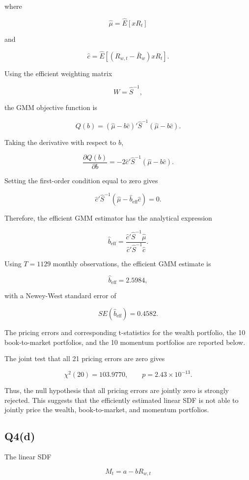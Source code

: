 \documentclass{article}
\begin{document}
where

\[
\hat\mu
=
\hat E[xR_t]
\]

and

\[
\hat c
=
\hat E\left[
(R_{w,t}-\bar R_w)xR_t
\right].
\]

Using the efficient weighting matrix

\[
W=\hat S^{-1},
\]

the GMM objective function is

\[
Q(b)
=
(\hat\mu-b\hat c)'
\hat S^{-1}
(\hat\mu-b\hat c).
\]

Taking the derivative with respect to \(b\),

\[
\frac{\partial Q(b)}{\partial b}
=
-2\hat c'
\hat S^{-1}
(\hat\mu-b\hat c).
\]

Setting the first-order condition equal to zero gives

\[
\hat c'
\hat S^{-1}
(\hat\mu-\hat b_{\mathrm{eff}}\hat c)
=
0.
\]

Therefore, the efficient GMM estimator has the analytical expression

\[
\hat b_{\mathrm{eff}}
=
\frac{
\hat c'\hat S^{-1}\hat\mu
}{
\hat c'\hat S^{-1}\hat c
}.
\]

Using \(T=1129\) monthly observations, the efficient GMM estimate is

\[
\hat b_{\mathrm{eff}}=2.5984,
\]

with a Newey-West standard error of

\[
SE(\hat b_{\mathrm{eff}})=0.4582.
\]

The pricing errors and corresponding t-statistics for the wealth portfolio, the 10 book-to-market portfolios, and the 10 momentum portfolios are reported below.



The joint test that all 21 pricing errors are zero gives

\[
\chi^2(20)=103.9770,
\qquad
p=2.43\times10^{-13}.
\]

Thus, the null hypothesis that all pricing errors are jointly zero is strongly rejected. This suggests that the efficiently estimated linear SDF is not able to jointly price the wealth, book-to-market, and momentum portfolios.

\subsection{Q4(d)}

The linear SDF

\[
M_t=a-bR_{w,t}
\]
\end{document}
